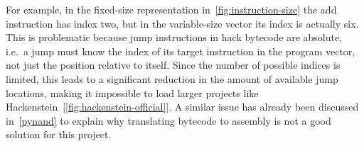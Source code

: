 For example, in the fixed-size representation in~\cref{fig:instruction-size} the add instruction has index two, but in the variable-size vector its index is actually six.
This is problematic because jump instructions in hack bytecode are absolute, i.e.\ a jump must know the index of its target instruction in the program vector, not just the position relative to itself.
Since the number of possible indices is limited, this leads to a significant reduction in the amount of available jump locations, making it impossible to load larger projects like Hackenstein~[\ref{fig:hackenstein-official}].
A similar issue has already been discussed in~\cref{pynand} to explain why translating bytecode to assembly is not a good solution for this project.

